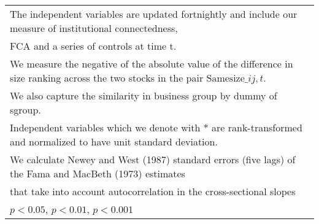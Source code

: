{\begin{tabular}{l*{7}{c}}
\multicolumn{8}{l}{\footnotesize The independent variables are updated fortnightly and include our measure of institutional connectedness,}\\
\multicolumn{8}{l}{\footnotesize  FCA and a series of controls at time t.}\\
\multicolumn{8}{l}{\footnotesize We measure the negative of the absolute value of the difference in size ranking across the two stocks in the pair $ \text{Samesize}\_{ij,t} $.}\\
\multicolumn{8}{l}{\footnotesize We also capture the similarity in business group by dummy of sgroup.}\\
\multicolumn{8}{l}{\footnotesize Independent variables which  we denote with * are rank-transformed and normalized to have unit standard deviation.}\\
\multicolumn{8}{l}{\footnotesize  We calculate Newey and West (1987) standard errors (five lags) of the Fama and MacBeth (1973) estimates }\\
\multicolumn{8}{l}{\footnotesize  that take into account autocorrelation in the cross-sectional slopes}\\
\multicolumn{8}{l}{\footnotesize \sym{*} \(p<0.05\), \sym{**} \(p<0.01\), \sym{***} \(p<0.001\)}\\
\end{tabular}
}
